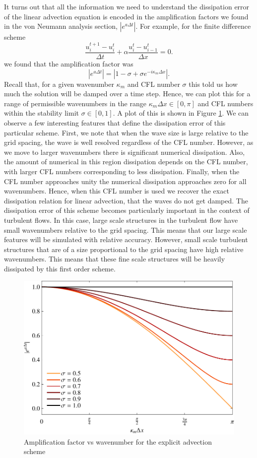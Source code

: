 It turns out that all the information we need to understand the dissipation error of the linear advection equation is encoded in the amplification factors we found in the von Neumann analysis section, $|e^{a\Delta t}|$. For example, for the finite difference scheme
\begin{equation}
	\frac{u_i^{t+1} - u_{i}^t}{\Delta t} +  \alpha \frac{u_i^t - u_{i-1}^t}{\Delta x} = 0.
\end{equation}
we found that the amplification factor was 
\begin{equation}
	|e^{a\Delta t}| = |1 - \sigma + \sigma e^{-i \kappa_m \Delta x}|.
\end{equation} 
Recall that, for a given wavenumber $\kappa_m$ and CFL number $\sigma$ this told us how much the solution will be damped over a time step. Hence, we can plot this for a range of permissible wavenumbers in the range $\kappa_m \Delta x \in [0,\pi]$ and CFL numbers within the stability limit $\sigma \in [0,1]$. A plot of this is shown in Figure \ref{fig:dissipation_advection_explicit}. We can observe a few interesting features that define the dissipation error of this particular scheme. First, we note that when the wave size is large relative to the grid spacing, the wave is well resolved regardless of the CFL number. However, as we move to larger wavenumbers there is significant numerical dissipation. Also, the amount of numerical in this region dissipation depends on the CFL number, with larger CFL numbers corresponding to less dissipation. Finally, when the CFL number approaches unity the numerical dissipation approaches zero for all wavenumbers. Hence, when this CFL number is used we recover the exact dissipation relation for linear advection, that the waves do not get damped. The dissipation error of this scheme becomes particularly important in the context of turbulent flows. In this case, large scale structures in the turbulent flow have small wavenumbers relative to the grid spacing. This means that our large scale features will be simulated with relative accuracy. However, small scale turbulent structures that are of a size proportional to the grid spacing have high relative wavenumbers. This means that these fine scale structures will be heavily dissipated by this first order scheme.
\begin{figure}[htbp]
	\centering
	\includegraphics[width=0.6\linewidth]{Pictures/ch13_dissipation_adv_explct}
	\caption{Amplification factor vs wavenumber for the explicit advection scheme}
	\label{fig:dissipation_advection_explicit}
\end{figure}
